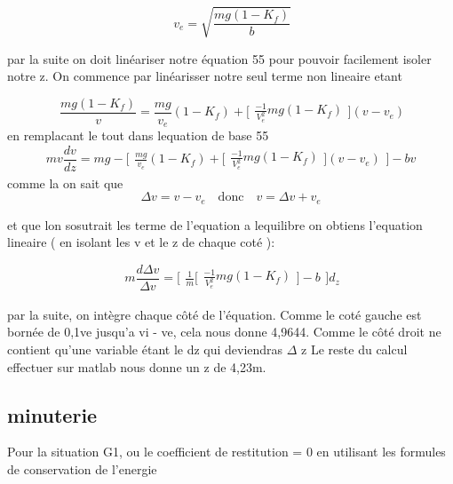 \documentclass{article}
\begin{document}
\begin{equation}
\ v_{e} = \sqrt{\frac{mg(1-K_{f})}{b}}
\end{equation}

par la suite on doit linéariser notre équation 55 pour pouvoir facilement isoler notre z. On commence par linéarisser notre seul terme non lineaire etant 

\begin{equation}
\ \frac{mg ( 1- K_{f})}{v} = \frac{mg}{v_{e}}(1-K_{f})+
\Bigg[\begin{array}{cc}
    \frac{-1}{V_{e}^2}mg(1-K_{f})
    \end{array}\Bigg]
    (v-v_{e})
\end{equation}
en remplacant le tout dans lequation de base 55
\begin{equation}
mv \frac{dv}{dz} = mg - \Bigg[\begin{array}{cc}
\frac{mg}{v_{e}}(1-K_{f})+
\Bigg[\begin{array}{cc}
    \frac{-1}{V_{e}^2}mg(1-K_{f})
    \end{array}\Bigg]
    (v-v_{e}) \end{array}\Bigg] - bv
\end{equation}
comme la on sait que
\begin{equation}
\Delta v = v - v_{e}  \quad  \textrm{donc} \quad    v = \Delta v+ v_{e}
\end{equation}

et que lon sosutrait les terme de l'equation a lequilibre on obtiens l'equation lineaire  ( en isolant les v et le z de chaque coté ):

\begin{equation}
\ m \frac{d \Delta v}{\Delta v}= \Bigg[\begin{array}{cc} \frac{1}{m} \Bigg[\begin{array}{cc}
    \frac{-1}{V_{e}^2}mg(1-K_{f})
    \end{array}\Bigg]  - b\end{array}\Bigg] d_{z}
\end{equation}

par la suite, on intègre chaque côté de l'équation. Comme le coté gauche est bornée de 0,1ve jusqu'a vi - ve, cela nous donne 4,9644. Comme le côté droit ne contient qu'une variable étant le dz qui deviendras $\Delta$ z
 Le reste du calcul effectuer sur matlab nous donne un z de 4,23m.
 
 
 \subsection{minuterie}
 Pour la situation G1, ou le coefficient de restitution = 0
 en utilisant les formules de conservation de l'energie 
 
\end{document}
